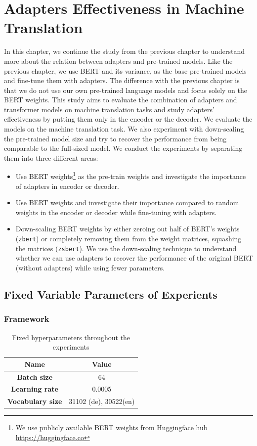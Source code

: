 
\chapter{Adapters Effectiveness in Machine Translation}
\label{chap:adaptefct}
In this chapter, we continue the study from the previous chapter to understand more about the relation between adapters and pre-trained models. Like the previous chapter, we use BERT and its variance, as the base pre-trained models and fine-tune them with adapters. The difference with the previous chapter is that we do not use our own pre-trained language models and focus solely on the BERT weights. This study aims to evaluate the combination of adapters and transformer models on machine translation tasks and study adapters' effectiveness by putting them only in the encoder or the decoder. We evaluate the models on the machine translation task. We also experiment with down-scaling the pre-trained model size and try to recover the performance from being comparable to the full-sized model. We conduct the experiments by separating them into three different areas:
\begin{itemize}
    \item Use BERT weights\footnote{We use publicly available BERT weights from Huggingface hub \url{https://huggingface.co}} as the pre-train weights and investigate the importance of adapters in encoder or decoder.
    \item Use BERT weights and investigate their importance compared to random weights in the encoder or decoder while fine-tuning with adapters.
    \item Down-scaling BERT weights by either zeroing out half of BERT's weights (\texttt{zbert}) or completely removing them from the weight matrices, squashing the matrices (\texttt{zsbert}). We use the down-scaling technique to understand whether we can use adapters to recover the performance of the original BERT (without adapters) while using fewer parameters.
\end{itemize}

\section{Fixed Variable Parameters of Experients}
\subsection{Framework}
\begin{table}[]
    \centering
    \begin{tabular}{@{}cc@{}}
        \toprule
        \textbf{Name}            & \textbf{Value}        \\ \midrule
        \textbf{Batch size}      & 64                    \\
        \textbf{Learning rate}   & 0.0005                \\
        \textbf{Vocabulary size} & 31102 (de), 30522(en) \\ \bottomrule
    \end{tabular}
    \caption{Fixed hyperparameters throughout the experiments}
    \label{tab:hyp_invest}
\end{table}

